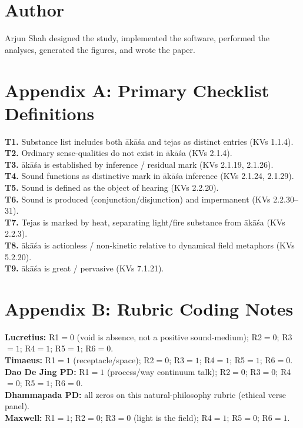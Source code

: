 \documentclass[12pt]{article}
\newcommand{\akasa}{ākāśa}
\begin{document}
\section*{Author}
Arjun Shah designed the study, implemented the software, performed the analyses, generated the figures, and wrote the paper.

\renewcommand{\refname}{Bibliography}



\newpage
\appendix
\section{Appendix A: Primary Checklist Definitions}
\label{app:T}
\noindent\textbf{T1.} Substance list includes both \akasa{} and tejas as distinct entries (KVs 1.1.4).\\
\textbf{T2.} Ordinary sense-qualities do not exist in \akasa{} (KVs 2.1.4).\\
\textbf{T3.} \akasa{} is established by inference / residual mark (KVs 2.1.19, 2.1.26).\\
\textbf{T4.} Sound functions as distinctive mark in \akasa{} inference (KVs 2.1.24, 2.1.29).\\
\textbf{T5.} Sound is defined as the object of hearing (KVs 2.2.20).\\
\textbf{T6.} Sound is produced (conjunction/disjunction) and impermanent (KVs 2.2.30--31).\\
\textbf{T7.} Tejas is marked by heat, separating light/fire substance from \akasa{} (KVs 2.2.3).\\
\textbf{T8.} \akasa{} is actionless / non-kinetic relative to dynamical field metaphors (KVs 5.2.20).\\
\textbf{T9.} \akasa{} is great / pervasive (KVs 7.1.21).

\section{Appendix B: Rubric Coding Notes}
\label{app:R}
\noindent\textbf{Lucretius:} R1$=0$ (void is absence, not a positive sound-medium); R2$=0$; R3$=1$; R4$=1$; R5$=1$; R6$=0$.\\
\textbf{Timaeus:} R1$=1$ (receptacle/space); R2$=0$; R3$=1$; R4$=1$; R5$=1$; R6$=0$.\\
\textbf{Dao De Jing PD:} R1$=1$ (process/way continuum talk); R2$=0$; R3$=0$; R4$=0$; R5$=1$; R6$=0$.\\
\textbf{Dhammapada PD:} all zeros on this natural-philosophy rubric (ethical verse panel).\\
\textbf{Maxwell:} R1$=1$; R2$=0$; R3$=0$ (light is the field); R4$=1$; R5$=0$; R6$=1$.
\end{document}

